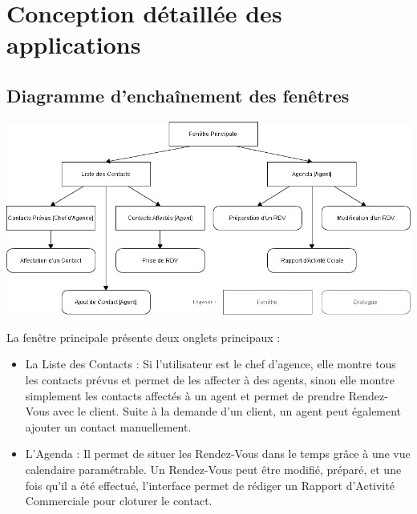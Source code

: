 
\section{Conception détaillée des applications}

\subsection{Diagramme d'enchaînement des fenêtres}

\begin {center}
\includegraphics[width=\textwidth]{diagramme-edf.png}
\end {center}

La fenêtre principale présente deux onglets principaux :

\begin{itemize}
\item La Liste des Contacts : Si l'utilisateur est le chef d'agence, elle montre tous les contacts prévus et permet de les affecter à des agents, sinon elle montre simplement les contacts affectés à un agent et permet de prendre Rendez-Vous avec le client. Suite à la demande d'un client, un agent peut également ajouter un contact manuellement.
\item L'Agenda : Il permet de situer les Rendez-Vous dans le temps grâce à une vue calendaire paramétrable. Un Rendez-Vous peut être modifié, préparé, et une fois qu'il a été effectué, l'interface permet de rédiger un Rapport d'Activité Commerciale pour cloturer le contact.
\end{itemize}